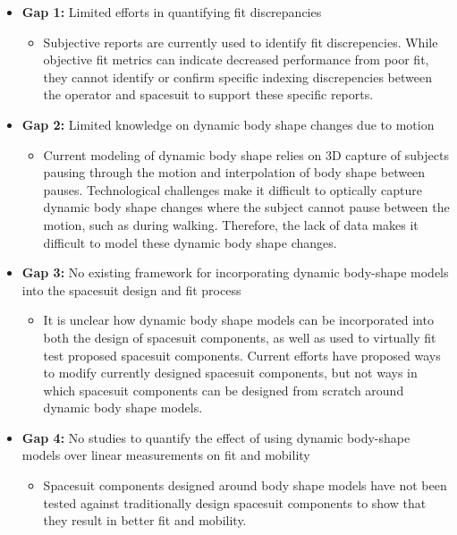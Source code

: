 \documentclass[defaultstyle,11pt]{comps}
\providecommand{\tightlist}{%
  \setlength{\itemsep}{0pt}\setlength{\parskip}{0pt}}
\begin{document}
\begin{itemize}
\tightlist
\item
  \textbf{Gap 1: }Limited efforts in quantifying fit discrepancies

  \begin{itemize}
  \tightlist
  \item
    Subjective reports are currently used to identify fit discrepencies. While objective fit metrics can indicate decreased performance from poor fit, they cannot identify or confirm specific indexing discrepencies between the operator and spacesuit to support these specific reports.
  \end{itemize}
\item
  \textbf{Gap 2: } Limited knowledge on dynamic body shape changes due to motion

  \begin{itemize}
  \tightlist
  \item
    Current modeling of dynamic body shape relies on 3D capture of subjects pausing through the motion and interpolation of body shape between pauses. Technological challenges make it difficult to optically capture dynamic body shape changes where the subject cannot pause between the motion, such as during walking. Therefore, the lack of data makes it difficult to model these dynamic body shape changes.
  \end{itemize}
\item
  \textbf{Gap 3: } No existing framework for incorporating dynamic body-shape models into the spacesuit design and fit process

  \begin{itemize}
  \tightlist
  \item
    It is unclear how dynamic body shape models can be incorporated into both the design of spacesuit components, as well as used to virtually fit test proposed spacesuit components. Current efforts have proposed ways to modify currently designed spacesuit components, but not ways in which spacesuit components can be designed from scratch around dynamic body shape models.
  \end{itemize}
\item
  \textbf{Gap 4: } No studies to quantify the effect of using dynamic body-shape models over linear measurements on fit and mobility

  \begin{itemize}
  \tightlist
  \item
    Spacesuit components designed around body shape models have not been tested against traditionally design spacesuit components to show that they result in better fit and mobility.
  \end{itemize}
\end{itemize}
\end{document}
